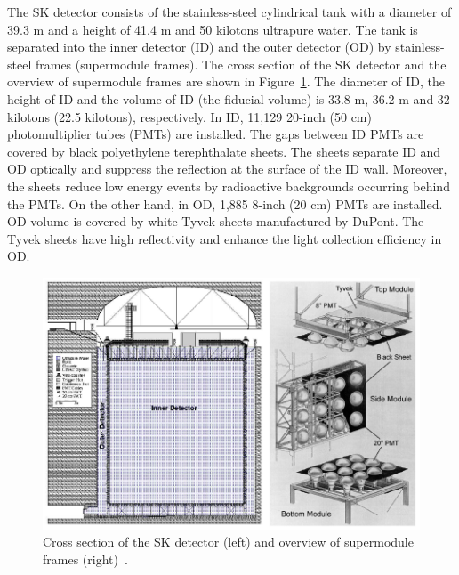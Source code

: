 \hs The SK detector consists of the stainless-steel cylindrical tank with a diameter of 39.3 m and a height of 41.4 m and 50 kilotons ultrapure water.
The tank is separated into the inner detector (ID) and the outer detector (OD) by stainless-steel frames (supermodule frames).
The cross section of the SK detector and the overview of supermodule frames are shown in Figure~\ref{002_F02_SK_SM}.
The diameter of ID, the height of ID and the volume of ID (the fiducial volume) is 33.8 m, 36.2 m and 32 kilotons (22.5 kilotons), respectively.
In ID, 11,129 20-inch (50 cm) photomultiplier tubes (PMTs) are installed.
The gaps between ID PMTs are covered by black polyethylene terephthalate sheets.
The sheets separate ID and OD optically and suppress the reflection at the surface of the ID wall.
Moreover, the sheets reduce low energy events by radioactive backgrounds occurring behind the PMTs.
On the other hand, in OD, 1,885 8-inch (20 cm) PMTs are installed.
OD volume is covered by white Tyvek sheets manufactured by DuPont.
The Tyvek sheets have high reflectivity and enhance the light collection efficiency in OD.

\begin{figure}[tbp]
	\centering
	\includegraphics[width=15cm]{Figures/002/F02_SK_SM}
	\caption[Cross section of the SK detector and overview of supermodule frames]{\label{002_F02_SK_SM} Cross section of the SK detector (left) and overview of supermodule frames (right)~\cite{2003Fukuda}.}
\end{figure}

